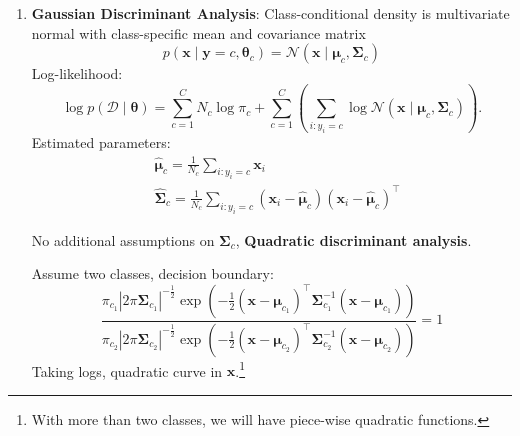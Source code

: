 \documentclass[11pt, %
	oneside, %
	english, %
	onehalfspacing, %
	parskip, %
	]{article} %
\theoremstyle{definition}
\begin{document}
\begin{enumerate}
	\item \textbf{Gaussian Discriminant Analysis}: Class-conditional density is multivariate normal with class-specific mean and covariance matrix
	\begin{equation*}
		p\left(\mathbf{x} \mid \boldsymbol{y}=c, \boldsymbol{\theta}_c\right)=\mathcal{N}\left(\mathbf{x} \mid \boldsymbol{\mu}_c, \boldsymbol{\Sigma}_c\right)
	\end{equation*}
	Log-likelihood:
	\begin{equation*}
		\log p(\mathcal{D} \mid \boldsymbol{\theta})=\sum_{c=1}^C N_c \log \pi_c+\sum_{c=1}^C\left(\sum_{i: y_i=c} \log \mathcal{N}\left(\mathbf{x} \mid \boldsymbol{\mu}_c, \boldsymbol{\Sigma}_c\right)\right) .
	\end{equation*}
	Estimated parameters:
	\begin{equation*}
		\begin{aligned}
			& \widehat{\boldsymbol{\mu}}_c=\frac{1}{N_c} \sum_{i: y_i=c} \mathbf{x}_i \\
			& \widehat{\boldsymbol{\Sigma}}_c=\frac{1}{N_c} \sum_{i: y_i=c}\left(\mathbf{x}_i-\widehat{\boldsymbol{\mu}}_c\right)\left(\mathbf{x}_i-\widehat{\boldsymbol{\mu}}_c\right)^{\top}
		\end{aligned}
	\end{equation*}

	No additional assumptions on $\mathbf{\Sigma}_c$, \textbf{Quadratic discriminant analysis}.

	Assume two classes, decision boundary:
	\begin{equation*}
		\frac{\pi_{c_1}\left|2 \pi \boldsymbol{\Sigma}_{c_1}\right|^{-\frac{1}{2}} \exp \left(-\frac{1}{2}\left(\mathbf{x}-\boldsymbol{\mu}_{c_1}\right)^{\top} \boldsymbol{\Sigma}_{c_1}^{-1}\left(\mathbf{x}-\boldsymbol{\mu}_{c_1}\right)\right)}{\pi_{c_2}\left|2 \pi \boldsymbol{\Sigma}_{c_2}\right|^{-\frac{1}{2}} \exp \left(-\frac{1}{2}\left(\mathbf{x}-\boldsymbol{\mu}_{c_2}\right)^{\top} \boldsymbol{\Sigma}_{c_2}^{-1}\left(\mathbf{x}-\boldsymbol{\mu}_{c_2}\right)\right)}=1
	\end{equation*}
	Taking logs, quadratic curve in $\mathbf{x}$.\footnote{With more than two classes, we will have piece-wise quadratic functions.}


\end{enumerate}
\end{document}
